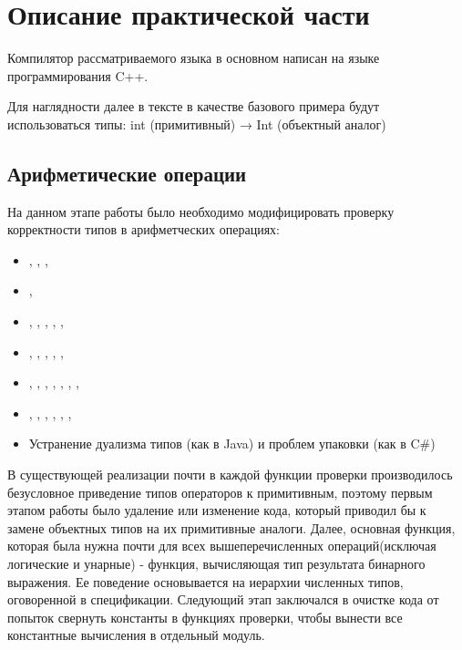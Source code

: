 \section{Описание практической части}
\label{sec:Chapter4} 

Компилятор рассматриваемого языка в основном написан на языке программирования C++.

Для наглядности далее в тексте в качестве базового примера будут использоваться типы:
int (примитивный) → Int (объектный аналог)

\subsection{Арифметические операции}
На данном этапе работы было необходимо модифицировать проверку корректности типов в арифметческих операциях:
\begin{itemize}[label={}]
    \item \code{+} , \code{-} , \code{+=} , \code{-=}
    \item \code{++} , \code{--}
    \item \code{*} , \code{/} , \code{\%} , \code{*=}, \code{/=}, \code{\%=}
    \item \code{$\langle \langle$} , \code{$\rangle \rangle$} , \code{$\langle \langle$=} , \code{$\rangle \rangle$=}, \code{$\rangle \rangle \rangle$}, \code{$\rangle \rangle \rangle$=}
    \item \code{|} , \code{|=} , \code{\&} , \code{\&=}, \code{\^}, \code{\^}\code{=}, \code{||} , \code{\&\&}
    \item \code{<} , \code{<=} , \code{>}, \code{>=}, \code{==}, \code{===}, \code{!}
    \item Устранение дуализма типов (как в Java) и проблем упаковки (как в C\#)
\end{itemize}

В существующей реализации почти в каждой функции проверки производилось безусловное приведение типов операторов к примитивным, поэтому первым этапом работы было удаление или изменение кода, который приводил бы к замене объектных типов на их примитивные аналоги. Далее, основная функция, которая была нужна почти для всех вышеперечисленных операций(исключая логические и унарные) - функция, вычисляющая тип результата бинарного выражения. Ее поведение основывается на иерархии численных типов, оговоренной в спецификации.
Следующий этап заключался в очистке кода от попыток свернуть константы в функциях проверки, чтобы вынести все константные вычисления в отдельный модуль.

